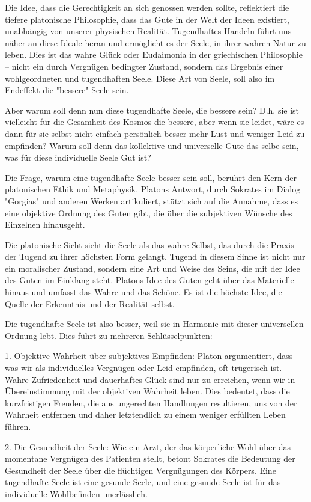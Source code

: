 \documentclass[12pt,a4paper]{article}
\begin{document}
Die Idee, dass die Gerechtigkeit an sich genossen werden sollte, reflektiert die tiefere platonische Philosophie, dass das Gute in der Welt der Ideen existiert, unabhängig von unserer physischen Realität. Tugendhaftes Handeln führt uns näher an diese Ideale heran und ermöglicht es der Seele, in ihrer wahren Natur zu leben. Dies ist das wahre Glück oder Eudaimonia in der griechischen Philosophie – nicht ein durch Vergnügen bedingter Zustand, sondern das Ergebnis einer wohlgeordneten und tugendhaften Seele. Diese Art von Seele, soll also im Endeffekt die "bessere" Seele sein.

Aber warum soll denn nun diese tugendhafte Seele, die bessere sein? D.h. sie ist vielleicht für die Gesamheit des Kosmos die bessere, aber wenn sie leidet, wäre es dann für sie selbst nicht einfach persönlich besser mehr Lust und weniger Leid zu empfinden? Warum soll denn das kollektive und universelle Gute das selbe sein, was für diese individuelle Seele Gut ist?

Die Frage, warum eine tugendhafte Seele besser sein soll, berührt den Kern der platonischen Ethik und Metaphysik. Platons Antwort, durch Sokrates im Dialog "Gorgias" und anderen Werken artikuliert, stützt sich auf die Annahme, dass es eine objektive Ordnung des Guten gibt, die über die subjektiven Wünsche des Einzelnen hinausgeht.

Die platonische Sicht sieht die Seele als das wahre Selbst, das durch die Praxis der Tugend zu ihrer höchsten Form gelangt. Tugend in diesem Sinne ist nicht nur ein moralischer Zustand, sondern eine Art und Weise des Seins, die mit der Idee des Guten im Einklang steht. Platons Idee des Guten geht über das Materielle hinaus und umfasst das Wahre und das Schöne. Es ist die höchste Idee, die Quelle der Erkenntnis und der Realität selbst.

Die tugendhafte Seele ist also besser, weil sie in Harmonie mit dieser universellen Ordnung lebt. Dies führt zu mehreren Schlüsselpunkten:

1. Objektive Wahrheit über subjektives Empfinden: Platon argumentiert, dass was wir als individuelles Vergnügen oder Leid empfinden, oft trügerisch ist. Wahre Zufriedenheit und dauerhaftes Glück sind nur zu erreichen, wenn wir in Übereinstimmung mit der objektiven Wahrheit leben. Dies bedeutet, dass die kurzfristigen Freuden, die aus ungerechten Handlungen resultieren, uns von der Wahrheit entfernen und daher letztendlich zu einem weniger erfüllten Leben führen.

2. Die Gesundheit der Seele: Wie ein Arzt, der das körperliche Wohl über das momentane Vergnügen des Patienten stellt, betont Sokrates die Bedeutung der Gesundheit der Seele über die flüchtigen Vergnügungen des Körpers. Eine tugendhafte Seele ist eine gesunde Seele, und eine gesunde Seele ist für das individuelle Wohlbefinden unerlässlich.
\end{document}
